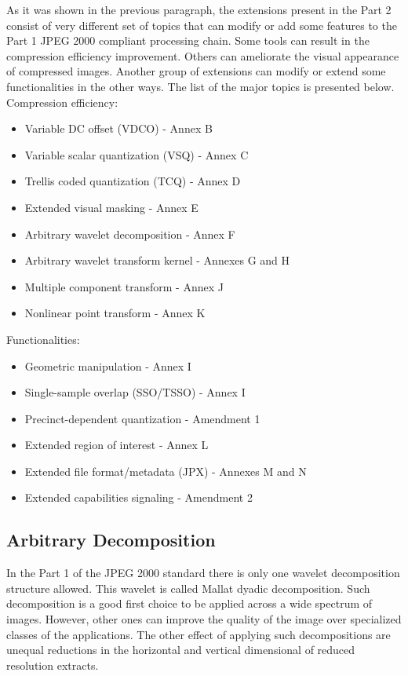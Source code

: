 As it was shown in the previous paragraph, the extensions present in the Part 2 consist of 
very different set of topics that can modify or add some features to the Part 1 JPEG 2000 compliant 
processing chain. Some tools can result in the compression efficiency improvement. Others can
ameliorate the visual appearance of compressed images. Another group of extensions can modify
or extend some functionalities in the other ways. The list of the major topics is presented below. \cite{jpeg_suite}
\newline \newline Compression efficiency:
\begin{itemize}
    \item Variable DC offset (VDCO) - Annex B
    \item Variable scalar quantization (VSQ) - Annex C
    \item Trellis coded quantization (TCQ) - Annex D
    \item Extended visual masking - Annex E
    \item Arbitrary wavelet decomposition - Annex F
    \item Arbitrary wavelet transform kernel - Annexes G and H
    \item Multiple component transform - Annex J
    \item Nonlinear point transform - Annex K \cite{jpeg_suite}
\end{itemize}
\hfill \break Functionalities:
\begin{itemize} 
    \item Geometric manipulation - Annex I
    \item Single-sample overlap (SSO/TSSO) - Annex I
    \item Precinct-dependent quantization - Amendment 1
    \item Extended region of interest - Annex L
    \item Extended file format/metadata (JPX) - Annexes M and N
    \item Extended capabilities signaling - Amendment 2 \cite{jpeg_suite}
\end{itemize}

\subsection{Arbitrary Decomposition}

In the Part 1 of the JPEG 2000 standard there is only one wavelet decomposition structure allowed.
This wavelet is called Mallat dyadic decomposition. Such decomposition is a good first choice
to be applied across a wide spectrum of images. However, other ones can improve the quality of the image
over specialized classes of the applications. The other effect of applying such decompositions are
unequal reductions in the horizontal and vertical dimensional of reduced resolution extracts. \cite{jpeg_suite}


